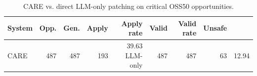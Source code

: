 \begin{table}[t]
    \centering
    \caption{CARE vs. direct LLM-only patching on critical OSS50 opportunities.}
    \label{tab:care-vs-llm}
    \begin{tabular}{lrrrrrrr}
        \toprule
        System & Opp. & Gen. & Apply & Apply rate & Valid & Valid rate & Unsafe \\
        \midrule
        CARE & 487 & 487 & 193 & 39.63%
        LLM-only & 487 & 487 & 63 & 12.94%
        \bottomrule
    \end{tabular}
\end{table}

